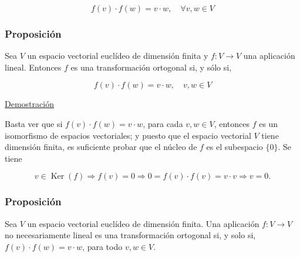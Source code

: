 \documentclass[12pt, a4paper, ones, notitlepage, openany,titlepage]{article}
\newcommand{\demostracion}{\noindent\underline{Demostración}}
\begin{document}
$$
f(v) \cdot f(w)=v \cdot w, \quad \forall v, w \in V
$$

\subsubsection{Proposición}
Sea $V$ un espacio vectorial euclídeo de dimensión finita y $f: V \rightarrow V$ una aplicación lineal. Entonces $f$ es una transformación ortogonal si, y sólo si,

$$
f(v) \cdot f(w)=v \cdot w, \quad v, w \in V
$$

\demostracion

Basta ver que si $f(v) \cdot f(w)=v \cdot w$, para cada $v, w \in V$, entonces $f$ es un isomorfismo de espacios vectoriales; y puesto que el espacio vectorial $V$ tiene dimensión finita, es suficiente probar que el núcleo de $f$ es el subespacio $\{0\}$. Se tiene

$$
v \in \operatorname{Ker}(f) \Longrightarrow f(v)=0 \Longrightarrow 0=f(v) \cdot f(v)=v \cdot v \Longrightarrow v=0 .
$$

\subsubsection{Proposición}
Sea $V$ un espacio vectorial euclídeo de dimensión finita. Una aplicación $f: V \rightarrow V$ no necesariamente lineal es una transformación ortogonal si, y solo si, $f(v) \cdot f(w)=v \cdot w$, para todo $v, w \in V$.\\
\end{document}
